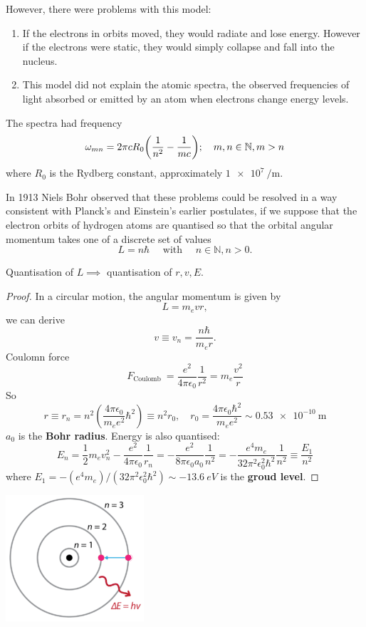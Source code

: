 \documentclass[a4paper,11pt]{article}
\begin{document}
However, there were problems with this model:
\begin{enumerate}
	\item If the electrons in orbits moved, they would radiate and lose energy.
	      However if the electrons were static, they would simply collapse and fall into the nucleus.
	\item This model did not explain the atomic spectra, the observed frequencies of light absorbed or emitted by an atom when electrons change energy levels.
\end{enumerate}
The spectra had frequency
\[
	\omega_{mn} = 2 \pi c R_0 \qty(\frac{1}{n^2} - \frac{1}{mc}); \quad m, n \in \mathbb N, m > n
\]
where \( R_0 \) is the Rydberg constant, approximately \( \SI{1e7}{\per\metre} \).

In 1913 Niels Bohr observed that these problems could be resolved in a way consistent with Planck's and Einstein's earlier postulates, if we suppose that the electron orbits of hydrogen atoms are quantised so that the orbital angular momentum takes one of a discrete set of values
\[
L=n \hbar \quad \text { with } \quad n \in \mathbb{N}, n>0 .
\]
\begin{proposition}
    Quantisation of $L \implies $ quantisation of $r,v,E$. 
\end{proposition}
\begin{proof}
    In a circular motion, the angular momentum is given by
\[
L=m_e v r,
\]
we can derive
\[
v \equiv v_n=\frac{n \hbar}{m_e r} .
\]
Coulomn force 
\[
    F_{\text {Coulomb }}=\frac{e^2}{4 \pi \epsilon_0} \frac{1}{r^2}=m_e \frac{v^2}{r} 
\]
So 
\[
    r \equiv r_n=n^2\left(\frac{4 \pi \epsilon_0}{m_e e^2} \hbar^2\right) \equiv n^2 r_0, \quad
        r_0=\frac{4 \pi \epsilon_0 \hbar^2}{m_e e^2} \sim \SI{0.53e-10}{\metre}
\]
$a_0$ is the \textbf{Bohr radius}. Energy is also quantised: 
\[
    E_n=\frac{1}{2} m_e v_n^2-\frac{e^2}{4 \pi \epsilon_0} \frac{1}{r_n}=-\frac{e^2}{8 \pi \epsilon_0 a_0} \frac{1}{n^2}=-\frac{e^4 m_e}{32 \pi^2 \epsilon_0^2 \hbar^2} \frac{1}{n^2} \equiv \frac{E_1}{n^2}
\]
where $ E_1=-\left(e^4 m_e\right) /\left(32 \pi^2 \epsilon_0^2 \hbar^2\right) \sim \SI{-13.6}{eV} $ is the \textbf{groud level}. 
\end{proof}

\begin{center}
    \includegraphics[scale=0.5]{qm6.png}
\end{center}
\end{document}
